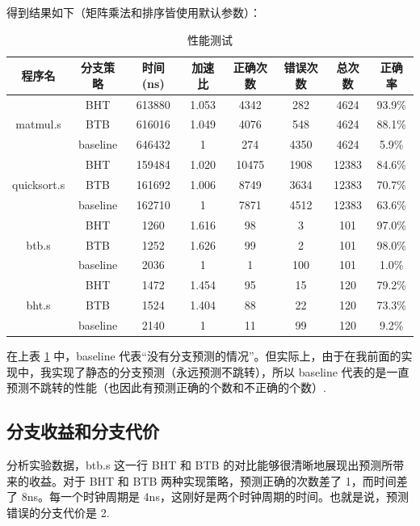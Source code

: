 \documentclass{article}
\begin{document}
得到结果如下（矩阵乘法和排序皆使用默认参数）：
\begin{table}[H]
  \centering
  \begin{tabular}{c c c c c c c c}
    \toprule
    程序名 & 分支策略 & 时间 (ns) & 加速比 & 正确次数 & 错误次数 & 总次数 & 正确率\\
    \midrule
    \multirow{3}{*}{matmul.s} & BHT & 613880 & 1.053 & 4342 & 282 & 4624 & 93.9\% \\
                              & BTB & 616016 & 1.049 & 4076 & 548 & 4624 & 88.1\% \\
                              & baseline & 646432 & 1 & 274 & 4350 & 4624 & 5.9\% \\
    \midrule
    \multirow{3}{*}{quicksort.s} & BHT & 159484 & 1.020 & 10475 & 1908 & 12383 & 84.6\% \\
                                 & BTB & 161692 & 1.006 & 8749 & 3634 & 12383 & 70.7\% \\
                                 & baseline & 162710 & 1 & 7871 & 4512 & 12383 & 63.6\% \\
    \midrule
    \multirow{3}{*}{btb.s} & BHT & 1260 & 1.616 & 98 & 3 & 101 & 97.0\% \\
                           & BTB & 1252 & 1.626 & 99 & 2 & 101 & 98.0\% \\
                           & baseline & 2036 & 1 & 1 & 100 & 101 & 1.0\% \\
    \midrule
    \multirow{3}{*}{bht.s} & BHT & 1472 & 1.454 & 95 & 15 & 120 & 79.2\% \\
                           & BTB & 1524 & 1.404 & 88 & 22 & 120 & 73.3\% \\
                           & baseline & 2140 & 1 & 11 & 99 & 120 & 9.2\% \\
    \bottomrule
  \end{tabular}
  \caption{性能测试}
  \label{tb:perf}
\end{table}
在上表 \ref{tb:perf} 中，baseline 代表“没有分支预测的情况”。但实际上，由于在我前面的实现中，我实现了静态的分支预测（永远预测不跳转），所以 baseline 代表的是一直预测不跳转的性能（也因此有预测正确的个数和不正确的个数）.
\subsection{分支收益和分支代价}

分析实验数据，btb.s 这一行 BHT 和 BTB 的对比能够很清晰地展现出预测所带来的收益。对于 BHT 和 BTB 两种实现策略，预测正确的次数差了 1，而时间差了 8ns。每一个时钟周期是 4ns，这刚好是两个时钟周期的时间。也就是说，预测错误的分支代价是 2.
\end{document}
